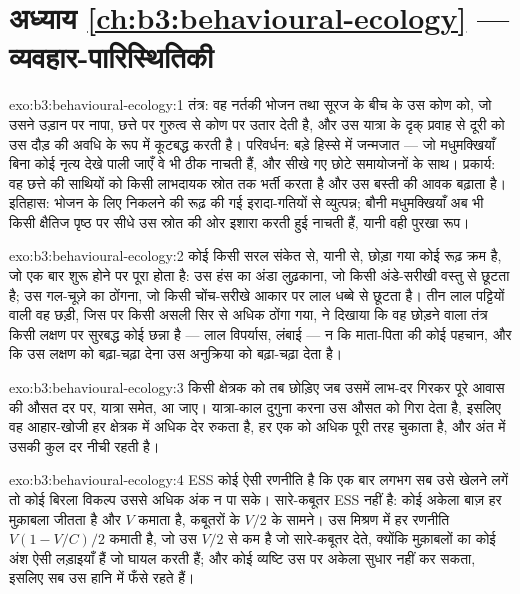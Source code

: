\section*{अध्याय \ref{ch:b3:behavioural-ecology} --- व्यवहार-पारिस्थितिकी}

\begin{solution}{exo:b3:behavioural-ecology:1}
तंत्र: वह नर्तकी भोजन तथा सूरज के बीच के उस कोण को, जो उसने उड़ान पर
नापा, छत्ते पर गुरुत्व से कोण पर उतार देती है, और उस यात्रा के दृक्
प्रवाह से दूरी को उस दौड़ की अवधि के रूप में कूटबद्ध करती है।
परिवर्धन: बड़े हिस्से में जन्मजात --- जो मधुमक्खियाँ बिना कोई नृत्य देखे
पाली जाएँ वे भी ठीक नाचती हैं, और सीखे गए छोटे समायोजनों के साथ।
प्रकार्य: वह छत्ते की साथियों को किसी लाभदायक स्रोत तक भर्ती करता है और
उस बस्ती की आवक बढ़ाता है। इतिहास: भोजन के लिए निकलने की रूढ़ की गई
इरादा-गतियों से व्युत्पन्न; बौनी मधुमक्खियाँ अब भी किसी क्षैतिज पृष्ठ पर
सीधे उस स्रोत की ओर इशारा करती हुई नाचती हैं, यानी वही पुरखा रूप।
\end{solution}

\begin{solution}{exo:b3:behavioural-ecology:2}
कोई  किसी सरल संकेत से, यानी  से, छोड़ा
गया कोई रूढ़ क्रम है, जो एक बार शुरू होने पर पूरा होता है: उस हंस का
अंडा लुढ़काना, जो किसी अंडे-सरीखी वस्तु से छूटता है; उस गल-चूज़े का
ठोंगना, जो किसी चोंच-सरीखे आकार पर लाल धब्बे से छूटता है। तीन लाल
पट्टियों वाली वह छड़ी, जिस पर किसी असली सिर से अधिक ठोंगा गया, ने दिखाया
कि वह छोड़ने वाला तंत्र किसी लक्षण पर सुरबद्ध कोई छन्ना है --- लाल
विपर्यास, लंबाई --- न कि माता-पिता की कोई पहचान, और कि उस लक्षण को
बढ़ा-चढ़ा देना उस अनुक्रिया को बढ़ा-चढ़ा देता है।
\end{solution}

\begin{solution}{exo:b3:behavioural-ecology:3}
किसी क्षेत्रक को तब छोड़िए जब उसमें लाभ-दर गिरकर पूरे आवास की औसत दर पर,
यात्रा समेत, आ जाए। यात्रा-काल दुगुना करना उस औसत को गिरा देता है,
इसलिए वह आहार-खोजी हर क्षेत्रक में अधिक देर रुकता है, हर एक को अधिक पूरी
तरह चुकाता है, और अंत में उसकी कुल दर नीची रहती है।
\end{solution}

\begin{solution}{exo:b3:behavioural-ecology:4}
ESS कोई ऐसी रणनीति है कि एक बार लगभग सब उसे खेलने लगें तो कोई बिरला
विकल्प उससे अधिक अंक न पा सके। सारे-कबूतर ESS नहीं है: कोई अकेला बाज़ हर
मुक़ाबला जीतता है और $V$ कमाता है, कबूतरों के $V/2$ के सामने। उस मिश्रण
में हर रणनीति $V(1 - V/C)/2$ कमाती है, जो उस $V/2$ से कम है जो
सारे-कबूतर देते, क्योंकि मुक़ाबलों का कोई अंश ऐसी लड़ाइयाँ हैं जो घायल
करती हैं; और कोई व्यष्टि उस पर अकेला सुधार नहीं कर सकता, इसलिए सब उस
हानि में फँसे रहते हैं।
\end{solution}

